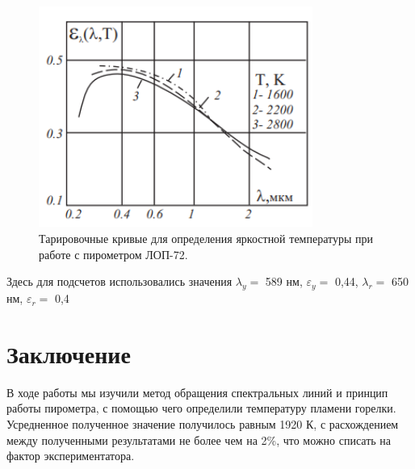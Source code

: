 \documentclass[12pt,a4paper]{article}
\begin{document}
\begin{figure}[H]
	\begin{center}
		\includegraphics[width = 0.8\textwidth]{MSS-1-6}
		\caption{Тарировочные кривые для определения яркостной температуры при работе с пирометром ЛОП-72.}
	\end{center}
\end{figure}

\par Здесь для подсчетов использовались значения $\lambda_y = $ 589 нм, $\varepsilon_y = $ 0,44, $\lambda_r = $ 650 нм, $\varepsilon_r = $ 0,4
\section{Заключение}

\par В ходе работы мы изучили метод обращения спектральных линий и принцип работы пирометра, с помощью чего определили температуру пламени горелки. Усредненное полученное значение получилось равным 1920 К, с расхождением между полученными результатами не более чем на 2\%, что можно списать на фактор экспериментатора. 
\end{document}
